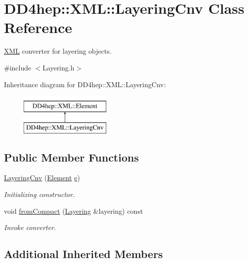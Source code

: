 \hypertarget{class_d_d4hep_1_1_x_m_l_1_1_layering_cnv}{}\section{D\+D4hep\+:\+:X\+ML\+:\+:Layering\+Cnv Class Reference}
\label{class_d_d4hep_1_1_x_m_l_1_1_layering_cnv}


\hyperlink{namespace_d_d4hep_1_1_x_m_l}{X\+ML} converter for layering objects.  




{\ttfamily \#include $<$Layering.\+h$>$}

Inheritance diagram for D\+D4hep\+:\+:X\+ML\+:\+:Layering\+Cnv\+:\begin{figure}[H]
\begin{center}
\leavevmode
\includegraphics[height=2.000000cm]{class_d_d4hep_1_1_x_m_l_1_1_layering_cnv}
\end{center}
\end{figure}
\subsection*{Public Member Functions}
\begin{DoxyCompactItemize}
\item 
\hyperlink{class_d_d4hep_1_1_x_m_l_1_1_layering_cnv_ab6b99c78432dbaf778778eb47163eda7}{Layering\+Cnv} (\hyperlink{class_d_d4hep_1_1_x_m_l_1_1_element}{Element} \hyperlink{_volumes_8cpp_a8a9a1f93e9b09afccaec215310e64142}{e})
\begin{DoxyCompactList}\small\item\em Initializing constructor. \end{DoxyCompactList}\item 
void \hyperlink{class_d_d4hep_1_1_x_m_l_1_1_layering_cnv_aee2e78c4203f97ec04b8583da85233ff}{from\+Compact} (\hyperlink{class_d_d4hep_1_1_layering}{Layering} \&layering) const
\begin{DoxyCompactList}\small\item\em Invoke converter. \end{DoxyCompactList}\end{DoxyCompactItemize}
\subsection*{Additional Inherited Members}


